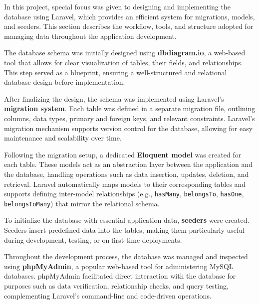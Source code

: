 \documentclass[12pt]{report}
\begin{document}
In this project, special focus was given to designing and implementing the database using Laravel, which provides an efficient system for migrations, models, and seeders. This section describes the workflow, tools, and structure adopted for managing data throughout the application development.

\vspace{0.5cm}

The database schema was initially designed using \textbf{dbdiagram.io}, a web-based tool that allows for clear visualization of tables, their fields, and relationships. This step served as a blueprint, ensuring a well-structured and relational database design before implementation.

\vspace{0.5cm}

After finalizing the design, the schema was implemented using Laravel’s \textbf{migration system}. Each table was defined in a separate migration file, outlining columns, data types, primary and foreign keys, and relevant constraints. Laravel’s migration mechanism supports version control for the database, allowing for easy maintenance and scalability over time.

\vspace{0.5cm}

Following the migration setup, a dedicated \textbf{Eloquent model} was created for each table. These models act as an abstraction layer between the application and the database, handling operations such as data insertion, updates, deletion, and retrieval. Laravel automatically maps models to their corresponding tables and supports defining inter-model relationships (e.g., \texttt{hasMany}, \texttt{belongsTo}, \texttt{hasOne}, \texttt{belongsToMany}) that mirror the relational schema.

\vspace{0.5cm}

To initialize the database with essential application data, \textbf{seeders} were created. Seeders insert predefined data into the tables, making them particularly useful during development, testing, or on first-time deployments.

\vspace{0.5cm}

Throughout the development process, the database was managed and inspected using \textbf{phpMyAdmin}, a popular web-based tool for administering MySQL databases. phpMyAdmin facilitated direct interaction with the database for purposes such as data verification, relationship checks, and query testing, complementing Laravel’s command-line and code-driven operations.
\end{document}
